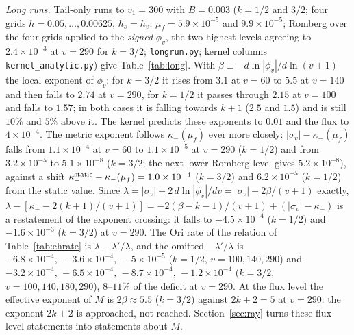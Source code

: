 \documentclass[11pt]{article}
\begin{document}
\emph{Long runs.} Tail-only runs to $v_1=300$ with $B=0.003$ ($k=1/2$ and $3/2$; four grids $h=0.05,\dots,0.00625$, $h_s=h_v$; $\mu_f=5.9\times10^{-5}$ and $9.9\times10^{-5}$; Romberg over the four grids applied to the \emph{signed} $\phi_v$, the two highest levels agreeing to $2.4\times10^{-3}$ at $v=290$ for $k=3/2$; \texttt{longrun.py}; kernel columns \texttt{kernel\_analytic.py}) give Table~\ref{tab:long}. With $\beta\equiv-d\ln|\phi_v|/d\ln(v+1)$ the local exponent of $\phi_v$: for $k=3/2$ it rises from $3.1$ at $v=60$ to $5.5$ at $v=140$ and then falls to $2.74$ at $v=290$, for $k=1/2$ it passes through $2.15$ at $v=100$ and falls to $1.57$; in both cases it is falling towards $k+1$ ($2.5$ and $1.5$) and is still $10\%$ and $5\%$ above it. The kernel predicts these exponents to $0.01$ and the flux to $4\times10^{-4}$. The metric exponent follows $\kappa_-(\mu_f)$ ever more closely: $|\sigma_v|-\kappa_-(\mu_f)$ falls from $1.1\times10^{-4}$ at $v=60$ to $1.1\times10^{-5}$ at $v=290$ ($k=1/2$) and from $3.2\times10^{-5}$ to $5.1\times10^{-8}$ ($k=3/2$; the next-lower Romberg level gives $5.2\times10^{-8}$), against a shift $\kappa_-^{\rm static}-\kappa_-(\mu_f)=1.0\times10^{-4}$ ($k=3/2$) and $6.2\times10^{-5}$ ($k=1/2$) from the static value. Since $\lambda=|\sigma_v|+2\,d\ln|\phi_v|/dv=|\sigma_v|-2\beta/(v+1)$ exactly, $\lambda-[\kappa_--2(k+1)/(v+1)]=-2(\beta-k-1)/(v+1)+(|\sigma_v|-\kappa_-)$ is a restatement of the exponent crossing: it falls to $-4.5\times10^{-4}$ ($k=1/2$) and $-1.6\times10^{-3}$ ($k=3/2$) at $v=290$. The Ori rate of the relation of Table~\ref{tab:ehrate} is $\lambda-\lambda'/\lambda$, and the omitted $-\lambda'/\lambda$ is $-6.8\times10^{-4},\,-3.6\times10^{-4},\,-5\times10^{-5}$ ($k=1/2$, $v=100,140,290$) and $-3.2\times10^{-4},\,-6.5\times10^{-4},\,-8.7\times10^{-4},\,-1.2\times10^{-4}$ ($k=3/2$, $v=100,140,180,290$), $8$--$11\%$ of the deficit at $v=290$. At the flux level the effective exponent of $M$ is $2\beta\approx5.5$ ($k=3/2$) against $2k+2=5$ at $v=290$: the exponent $2k+2$ is approached, not reached. Section~\ref{sec:ray} turns these flux-level statements into statements about $M$.
\end{document}
